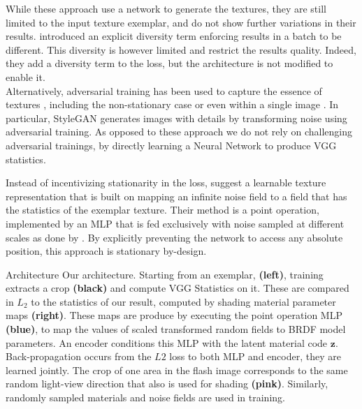 \documentclass[acmtog, review, anonymous]{acmart}
\begin{document}
While these approach use a network to generate the textures, they are still limited to the input texture exemplar, and do not show further variations in their results.
\citet{ulyanov2017improved} introduced an explicit diversity term enforcing results in a batch to be different.
This diversity is however limited and restrict the results quality. Indeed, they add a diversity term to the loss, but the architecture is not modified to enable it.\\
Alternatively,  adversarial training has been used to capture the essence of textures \cite{shaham2019singan, bergmann2017learning}, including the non-stationary case \cite{zhou2018non} or even within a single image \cite{shaham2019singan}.
In particular, StyleGAN \cite{karras2019style} generates images with details by transforming noise using adversarial training.
As opposed to these approach we do not rely on challenging adversarial trainings, by directly learning a Neural Network to produce VGG statistics.

Instead of incentivizing stationarity in the loss, \citet{henzler2019learning} suggest a learnable texture representation that is built on mapping an infinite noise field to a field that has the statistics of the exemplar texture.
Their method is a point operation, implemented by an MLP that is fed exclusively with noise sampled at different scales as done by \citet{perlin1985noise}.
By explicitly preventing the network to access any absolute position, this approach is stationary by-design.


\mycfigure
{Architecture}
{Our architecture.
Starting from an exemplar, \textbf{(left)}, training extracts a crop \textbf{(black)} and compute VGG Statistics on it.
These are compared in $L_2$ to the statistics of our result, computed by shading material parameter maps \textbf{(right)}.
These maps are produce by executing the point operation MLP \textbf{(blue)}, to map the values of scaled transformed random fields to BRDF model parameters.
An encoder conditions this MLP with the latent material code $\mathbf z$.
Back-propagation occurs from the $L2$ loss to both MLP and encoder, \ie they are learned jointly.
The crop of one area in the flash image corresponds to the same random light-view direction that also is used for shading \textbf{(pink)}.
Similarly, randomly sampled materials and noise fields are used in training.
}
\end{document}

